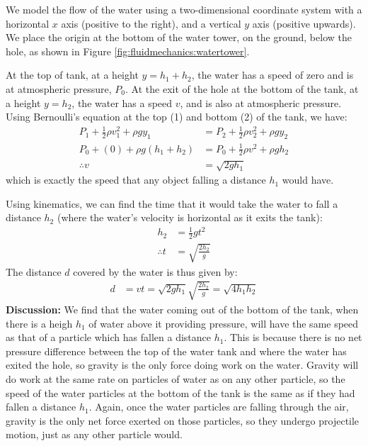 {{\begin{example}
We model the flow of the water using a two-dimensional coordinate system with a horizontal $x$ axis (positive to the right), and a vertical $y$ axis (positive upwards). We place the origin at the bottom of the water tower, on the ground, below the hole, as shown in Figure \ref{fig:fluidmechanics:watertower}.
 
At the top of tank, at a height $y = h_1+h_2$, the water has a speed of zero and is at atmospheric pressure, $P_0$. At the exit of the hole at the bottom of the tank, at a height $y = h_2$, the water has a speed $v$, and is also at atmospheric pressure. Using Bernoulli's equation at the top (1) and bottom (2) of the tank, we have:
\begin{align*}
P_1 +\frac{1}{2}\rho v_1^2+ \rho g y_1&= P_2 + \frac{1}{2}\rho v_2^2 + \rho g y_2\\
P_0 + (0) + \rho g (h_1+h_2) &= P_0 +  \frac{1}{2}\rho v^2 + \rho g h_2\\
\therefore v &= \sqrt{2gh_1}
\end{align*}
which is exactly the speed that any object falling a distance $h_1$ would have. 

Using kinematics, we can find the time that it would take the water to fall a distance $h_2$ (where the water's velocity is horizontal as it exits the tank):
\begin{align*}
h_2 &= \frac{1}{2}gt^2\\
\therefore t &= \sqrt{\frac{2h_2}{g}}
\end{align*}
The distance $d$ covered by the water is thus given by:
\begin{align*}
d &= vt = \sqrt{2gh_1}\sqrt{\frac{2h_2}{g}} = \sqrt{4h_1h_2}
\end{align*}
\textbf{Discussion:} We find that the water coming out of the bottom of the tank, when there is a heigh $h_1$ of water above it providing pressure, will have the same speed as that of a particle which has fallen a distance $h_1$. This is because there is no net pressure difference between the top of the water tank and where the water has exited the hole, so gravity is the only force doing work on the water. Gravity will do work at the same rate on particles of water as on any other particle, so the speed of the water particles at the bottom of the tank is the same as if they had fallen a distance $h_1$. Again, once the water particles are falling through the air, gravity is the only net force exerted on those particles, so they undergo projectile motion, just as any other particle would.
\end{example}

}}
